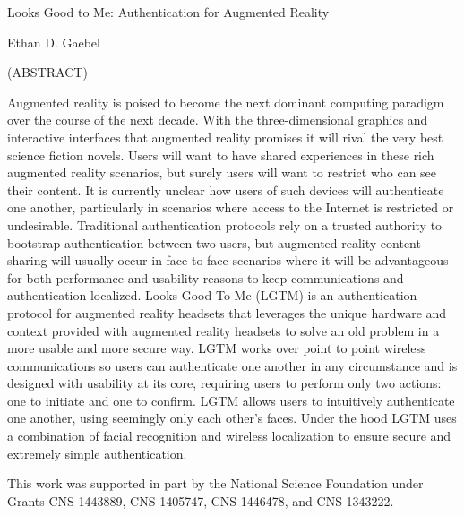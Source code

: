 \documentclass[12pt]{report}
\begin{document}
\thispagestyle{empty}
\begin{center}

{\large Looks Good to Me: 
Authentication for Augmented Reality}

\vfill

Ethan D. Gaebel

\vfill

(ABSTRACT)

Augmented reality is poised to become the next dominant computing paradigm over the course of the next decade. With the three-dimensional graphics and interactive interfaces that augmented reality promises it will rival the very best science fiction novels. Users will want to have shared experiences in these rich augmented reality scenarios, but surely users will want to restrict who can see their content. It is currently unclear how users of such devices will authenticate one another, particularly in scenarios where access to the Internet is restricted or undesirable. Traditional authentication protocols rely on a trusted authority to bootstrap authentication between two users, but augmented reality content sharing will usually occur in face-to-face scenarios where it will be advantageous for both performance and usability reasons to keep communications and authentication localized. Looks Good To Me (LGTM) is an authentication protocol for augmented reality headsets that leverages the unique hardware and context provided with augmented reality headsets to solve an old problem in a more usable and more secure way. LGTM works over point to point wireless communications so users can authenticate one another in any circumstance and is designed with usability at its core, requiring users to perform only two actions: one to initiate and one to confirm. LGTM allows users to intuitively authenticate one another, using seemingly only each other's faces. Under the hood LGTM uses a combination of facial recognition and wireless localization to ensure secure and extremely simple authentication.

\vfill

\end{center}

\vfill

This work was supported in part by the National Science Foundation under Grants 
CNS-1443889, CNS-1405747, CNS-1446478, and CNS-1343222.

\pagebreak

\end{document}
